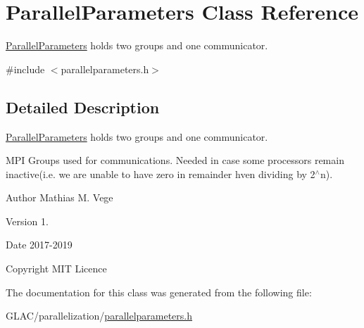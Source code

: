 \hypertarget{class_parallel_parameters}{}\section{Parallel\+Parameters Class Reference}
\label{class_parallel_parameters}


\mbox{\hyperlink{class_parallel_parameters}{Parallel\+Parameters}} holds two groups and one communicator.  




{\ttfamily \#include $<$parallelparameters.\+h$>$}



\subsection{Detailed Description}
\mbox{\hyperlink{class_parallel_parameters}{Parallel\+Parameters}} holds two groups and one communicator. 

M\+PI Groups used for communications. Needed in case some processors remain inactive(i.\+e. we are unable to have zero in remainder hven dividing by 2$^\wedge$n).

\begin{DoxyAuthor}{Author}
Mathias M. Vege 
\end{DoxyAuthor}
\begin{DoxyVersion}{Version}
1. 
\end{DoxyVersion}
\begin{DoxyDate}{Date}
2017-\/2019 
\end{DoxyDate}
\begin{DoxyCopyright}{Copyright}
M\+IT Licence 
\end{DoxyCopyright}


The documentation for this class was generated from the following file\+:\begin{DoxyCompactItemize}
\item 
G\+L\+A\+C/parallelization/\mbox{\hyperlink{parallelparameters_8h}{parallelparameters.\+h}}\end{DoxyCompactItemize}
